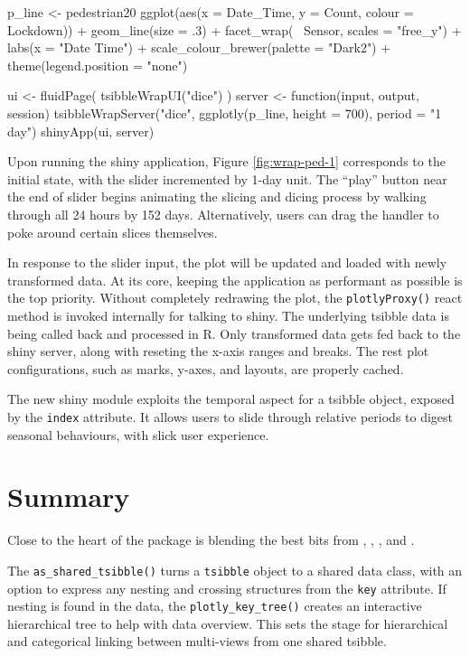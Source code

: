 \begin{Schunk}
\begin{Sinput}
p_line <- pedestrian20 %
  ggplot(aes(x = Date_Time, y = Count, colour = Lockdown)) +
  geom_line(size = .3) +
  facet_wrap(~ Sensor, scales = "free_y") +
  labs(x = "Date Time") +
  scale_colour_brewer(palette = "Dark2") +
  theme(legend.position = "none")

ui <- fluidPage(
  tsibbleWrapUI("dice")
)
server <- function(input, output, session) {
  tsibbleWrapServer("dice", ggplotly(p_line, height = 700), period = "1 day")
}
shinyApp(ui, server)
\end{Sinput}
\end{Schunk}

Upon running the shiny application, Figure \ref{fig:wrap-ped-1}
corresponds to the initial state, with the slider incremented by 1-day
unit. The ``play'' button near the end of slider begins animating the
slicing and dicing process by walking through all 24 hours by 152 days.
Alternatively, users can drag the handler to poke around certain slices
themselves.

In response to the slider input, the plot will be updated and loaded
with newly transformed data. At its core, keeping the application as
performant as possible is the top priority. Without completely redrawing
the plot, the \texttt{plotlyProxy()} react method is invoked internally
for talking to shiny. The underlying tsibble data is being called back
and processed in R. Only transformed data gets fed back to the shiny
server, along with reseting the x-axis ranges and breaks. The rest plot
configurations, such as marks, y-axes, and layouts, are properly cached.

The new shiny module exploits the temporal aspect for a tsibble object,
exposed by the \texttt{index} attribute. It allows users to slide
through relative periods to digest seasonal behaviours, with slick user
experience.

\hypertarget{summary}{%
\section{Summary}\label{summary}}

Close to the heart of the  package is blending the
best bits from , , ,
and .

The \texttt{as\_shared\_tsibble()} turns a \texttt{tsibble} object to a
shared data class, with an option to express any nesting and crossing
structures from the \texttt{key} attribute. If nesting is found in the
data, the \texttt{plotly\_key\_tree()} creates an interactive
hierarchical tree to help with data overview. This sets the stage for
hierarchical and categorical linking between multi-views from one shared
tsibble.

